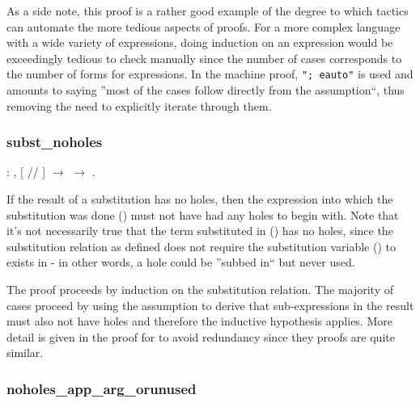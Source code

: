 \documentclass[12pt]{report}
\begin{document}
As a side note, this proof is a rather good example of the degree to
which tactics can automate the more tedious aspects of proofs. For
a more complex language with a wide variety of expressions, doing
induction on an expression would be exceedingly tedious to check
manually since the number of cases corresponds to the number of forms
for expressions. In the machine proof, \texttt{"; eauto"} is used and
amounts to saying ''most of the cases follow directly from the
assumption``, thus removing the need to explicitly iterate through
them. 

\subsubsection{subst\_noholes}

\begin{coqdoccode}
\coqdocemptyline
\coqdocindent{1.00em}
  : \coqdockw{\ensuremath{\forall}}    ,\coqdoceol
\coqdocindent{2.00em}
[  //  ]    \ensuremath{\rightarrow}\coqdoceol
\coqdocindent{2.00em}
  \ensuremath{\rightarrow}\coqdoceol
\coqdocindent{2.00em}
 .\coqdoceol
\coqdocemptyline
\end{coqdoccode}
If the result of a substitution has no holes, then the expression
into which the substitution was done () must not have had any
holes to begin with. Note that it's not necessarily true that the
term substituted in () has no holes, since the substitution
relation as defined does not require the substitution variable ()
to exists in  - in other words, a hole could be ''subbed in`` but
never used. 


The proof proceeds by induction on the substitution relation. The
majority of cases proceed by using the  assumption to derive
that sub-expressions in the result must also not have holes and
therefore the inductive hypothesis applies. More detail is given in
the proof for  to avoid redundancy since
they proofs are quite similar. 

\subsubsection{noholes\_app\_arg\_orunused}
\end{document}
